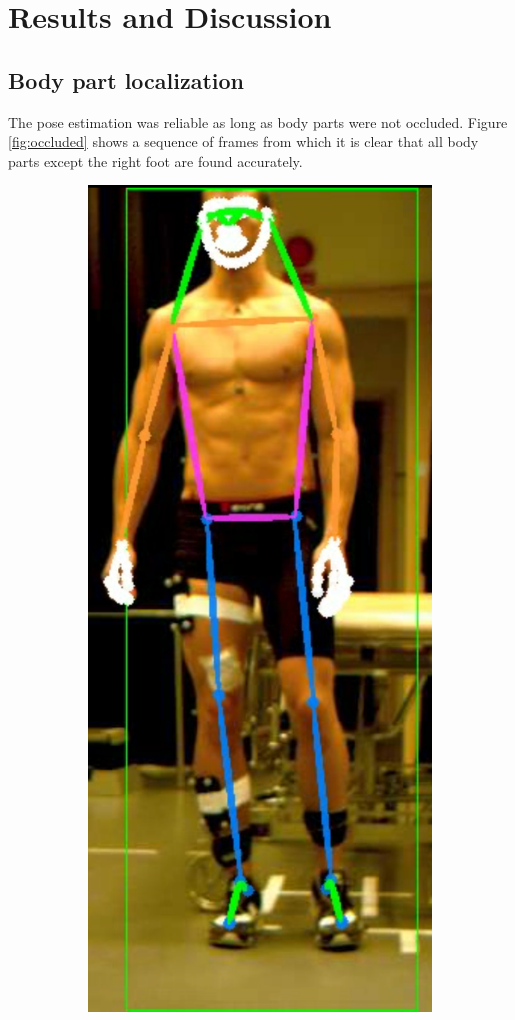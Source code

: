 \chapter{Results and Discussion} \label{ch:results}
\section{Body part localization}
The pose estimation was reliable as long as body parts were not occluded. Figure \ref{fig:occluded} shows a sequence of frames from which it is clear that all body parts except the right foot are found accurately.

{\addtolength{\textfloatsep}{-0.2in}
\begin{figure}[h]
  \centering
  \begin{subfigure}[t]{0.22\textwidth}
    \centering
    \includegraphics[height=1.3\textwidth]{files/figs/res/hpe/36-1.png}
    \caption{}
  \end{subfigure}

\end{figure}}
